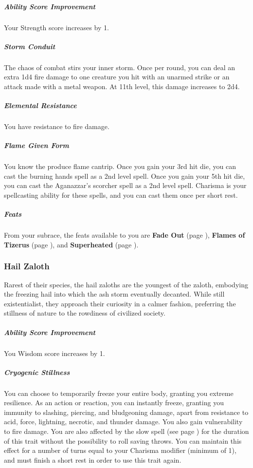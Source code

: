     \subparagraph{Ability Score Improvement} Your Strength score increases by 1.

    \subparagraph{Storm Conduit} The chaos of combat stirs your inner storm.
    Once per round, you can deal an extra 1d4 fire damage to one creature you hit with an unarmed strike or an attack made with a metal weapon.
    At 11th level, this damage increases to 2d4.

    \subparagraph{Elemental Resistance} You have resistance to fire damage.

    \subparagraph{Flame Given Form} You know the produce flame cantrip.
    Once you gain your 3rd hit die, you can cast the burning hands spell as a 2nd level spell.
    Once you gain your 5th hit die, you can cast the Aganazzar's scorcher spell as a 2nd level spell.
    Charisma is your spellcasting ability for these spells, and you can cast them once per short rest.

    \subparagraph{Feats} From your subrace, the feats available to you are
    \textbf{Fade Out} (page \pageref{feat::fadeout}),
    \textbf{Flames of Tizerus} (page \pageref{feat::flamesoftizerus}), and
    \textbf{Superheated} (page \pageref{feat::superheated}).

\subsubsection{Hail Zaloth}
    Rarest of their species, the hail zaloths are the youngest of the zaloth, embodying the freezing hail into which the ash storm eventually decanted.
    While still existentialist, they approach their curiosity in a calmer fashion, preferring the stillness of nature to the rowdiness of civilized society.

    \subparagraph{Ability Score Improvement} You Wisdom score increases by 1.

    \subparagraph{Cryogenic Stillness} You can choose to temporarily freeze your entire body, granting you extreme resilience.
    As an action or reaction, you can instantly freeze, granting you immunity to slashing, piercing, and bludgeoning damage, apart from resistance to acid, force, lightning, necrotic, and thunder damage.
    You also gain vulnerability to fire damage.
    You are also affected by the slow spell (see page \pageref{spell::slow}) for the duration of this trait without the possibility to roll saving throws.
    You can maintain this effect for a number of turns equal to your Charisma modifier (minimum of 1), and must finish a short rest in order to use this trait again.

